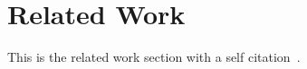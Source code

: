 \section{Related Work}
\label{sec:prior}

This is the related work section with a self citation~\cite{Saito:2018:HSU}.
